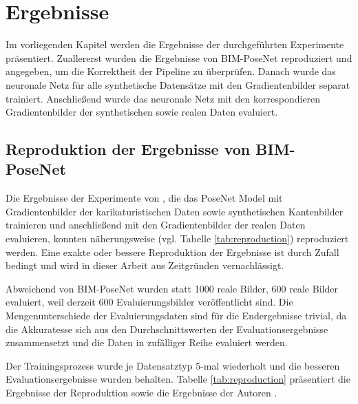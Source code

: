 
\section{Ergebnisse}
Im vorliegenden Kapitel werden die Ergebnisse der durchgeführten Experimente präsentiert. Zuallererst wurden die Ergebnisse von BIM-PoseNet \cite{acharyaBIMPoseNetIndoorCamera2019} reproduziert und angegeben, um die Korrektheit der Pipeline zu überprüfen. Danach wurde das neuronale Netz für alle synthetische Datensätze mit den Gradientenbilder separat trainiert. Anschließend wurde das neuronale Netz mit den korrespondieren Gradientenbilder der synthetischen sowie realen Daten evaluiert.


\subsection{Reproduktion der Ergebnisse von BIM-PoseNet}
Die Ergebnisse der Experimente von \citet{acharyaBIMPoseNetIndoorCamera2019}, die das PoseNet Model mit Gradientenbilder der karikaturistischen Daten sowie synthetischen Kantenbilder trainieren und anschließend mit den Gradientenbilder der realen Daten evaluieren, konnten näherungsweise (vgl. Tabelle \ref{tab:reproduction}) reproduziert werden. Eine exakte oder bessere Reproduktion der Ergebnisse ist durch Zufall bedingt und wird in dieser Arbeit aus Zeitgründen vernachlässigt.

Abweichend von BIM-PoseNet wurden statt 1000 reale Bilder, 600 reale Bilder evaluiert, weil derzeit 600 Evaluierungsbilder veröffentlicht sind. Die Mengenunterschiede der Evaluierungsdaten sind für die Endergebnisse trivial, da die Akkuratesse sich aus den Durchschnittswerten der Evaluationsergebnisse zusammensetzt und die Daten in zufälliger Reihe evaluiert werden. 

Der Trainingsprozess wurde je Datensatztyp 5-mal wiederholt und die besseren Evaluationsergebnisse wurden behalten. Tabelle \ref{tab:reproduction} präsentiert die Ergebnisse der Reproduktion sowie die Ergebnisse der Autoren \citet{acharyaBIMPoseNetIndoorCamera2019}.


